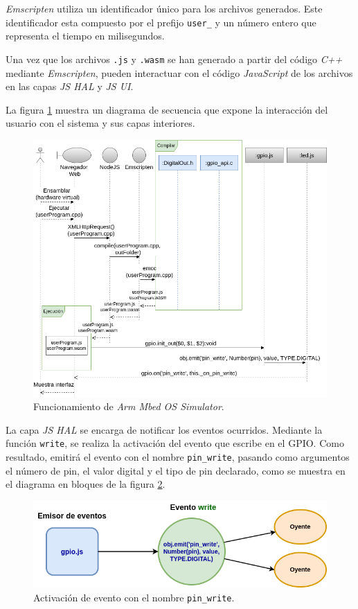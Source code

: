 \textit{Emscripten} utiliza un identificador único para los archivos generados. Este identificador esta compuesto por el prefijo \texttt{user\_} y un número entero que representa el tiempo en milisegundos.

Una vez que los archivos \texttt{.js} y \texttt{.wasm} se han generado a partir del código \textit{C++} mediante \textit{Emscripten}, pueden interactuar con el código \textit{JavaScript} de los archivos en las capas \textit{JS HAL} y \textit{JS UI}.

La figura \ref{fig:DiagramaSecuenciaMBED} muestra un diagrama de secuencia que expone la interacción del usuario con el sistema y sus capas interiores.

\begin{figure}[ht]
	\centering
	\includegraphics[scale=.49]{./Figures/DiagramaSecuenciaMBED.png}
	\caption{Funcionamiento de \textit{Arm Mbed OS Simulator}.}
	\label{fig:DiagramaSecuenciaMBED}
\end{figure}

La capa \textit{JS HAL} se encarga de notificar los eventos ocurridos. Mediante la función \texttt{write}, se realiza la activación del evento que escribe en el GPIO. 
Como resultado, emitirá el evento con el nombre \texttt{pin\_write}, pasando como argumentos el número de pin, el valor digital y el tipo de pin declarado, como se muestra en el diagrama en bloques de la figura \ref{fig:GPIOEventEmitter}.

\begin{figure}[ht]
	\centering
	\includegraphics[scale=.55]{./Figures/GPIOEventEmitter.png}
	\caption{Activación de evento con el nombre \texttt{pin\_write}.}
	\label{fig:GPIOEventEmitter}
\end{figure}

